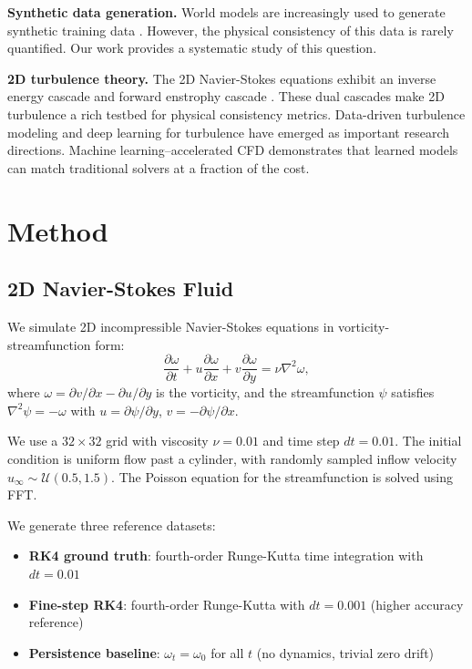 \documentclass[reprint,aps,pre]{revtex4-2}
\begin{document}
\textbf{Synthetic data generation.} World models are increasingly used to generate synthetic training data \cite{li2025pinwm}. However, the physical consistency of this data is rarely quantified. Our work provides a systematic study of this question.

\textbf{2D turbulence theory.} The 2D Navier-Stokes equations exhibit an inverse energy cascade and forward enstrophy cascade \cite{kraichnan1967inertial,batchelor1969computation}. These dual cascades make 2D turbulence a rich testbed for physical consistency metrics. Data-driven turbulence modeling \cite{duraisamy2019turbulence} and deep learning for turbulence \cite{beck2019deep} have emerged as important research directions. Machine learning--accelerated CFD \cite{kochkov2021machine} demonstrates that learned models can match traditional solvers at a fraction of the cost.

\section{Method}
\label{sec:method}

\subsection{2D Navier-Stokes Fluid}

We simulate 2D incompressible Navier-Stokes equations in vorticity-streamfunction form:
\begin{equation}
\frac{\partial \omega}{\partial t} + u\frac{\partial \omega}{\partial x} + v\frac{\partial \omega}{\partial y} = \nu\nabla^2\omega,
\end{equation}
where $\omega = \partial v/\partial x - \partial u/\partial y$ is the vorticity, and the streamfunction $\psi$ satisfies $\nabla^2\psi = -\omega$ with $u = \partial\psi/\partial y$, $v = -\partial\psi/\partial x$.

We use a $32\times32$ grid with viscosity $\nu=0.01$ and time step $dt=0.01$. The initial condition is uniform flow past a cylinder, with randomly sampled inflow velocity $u_\infty \sim \mathcal{U}(0.5, 1.5)$. The Poisson equation for the streamfunction is solved using FFT.

We generate three reference datasets:
\begin{itemize}
\item \textbf{RK4 ground truth}: fourth-order Runge-Kutta time integration with $dt=0.01$
\item \textbf{Fine-step RK4}: fourth-order Runge-Kutta with $dt=0.001$ (higher accuracy reference)
\item \textbf{Persistence baseline}: $\omega_t = \omega_0$ for all $t$ (no dynamics, trivial zero drift)
\end{itemize}
\end{document}
